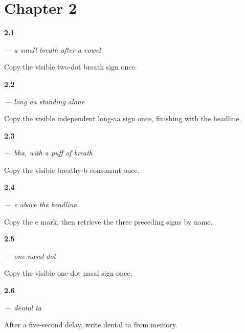 \section*{Chapter 2}

\noindent\begin{minipage}[t]{\linewidth}
\raggedright
\hypertarget{review-MR-W02-visarga-model}{\textbf{2.1}} \emph{ — a small breath after a vowel}\par
\small Copy the visible two-dot breath sign once.
\end{minipage}\par\medskip

\noindent\begin{minipage}[t]{\linewidth}
\raggedright
\hypertarget{review-MR-W02-aa-independent-guided}{\textbf{2.2}} \emph{ — long aa standing alone}\par
\small Copy the visible independent long-aa sign once, finishing with the headline.
\end{minipage}\par\medskip

\noindent\begin{minipage}[t]{\linewidth}
\raggedright
\hypertarget{review-MR-W02-bha-guided}{\textbf{2.3}} \emph{ — bha, with a puff of breath}\par
\small Copy the visible breathy-b consonant once.
\end{minipage}\par\medskip

\noindent\begin{minipage}[t]{\linewidth}
\raggedright
\hypertarget{review-MR-W02-e-matra-r1}{\textbf{2.4}} \emph{ — e above the headline}\par
\small Copy the e mark, then retrieve the three preceding signs by name.
\end{minipage}\par\medskip

\noindent\begin{minipage}[t]{\linewidth}
\raggedright
\hypertarget{review-MR-W02-anusvara-guided}{\textbf{2.5}} \emph{ — one nasal dot}\par
\small Copy the visible one-dot nasal sign once.
\end{minipage}\par\medskip

\noindent\begin{minipage}[t]{\linewidth}
\raggedright
\hypertarget{review-MR-W02-ta-delayed}{\textbf{2.6}} \emph{ — dental ta}\par
\small After a five-second delay, write dental ta from memory.
\end{minipage}\par\medskip

